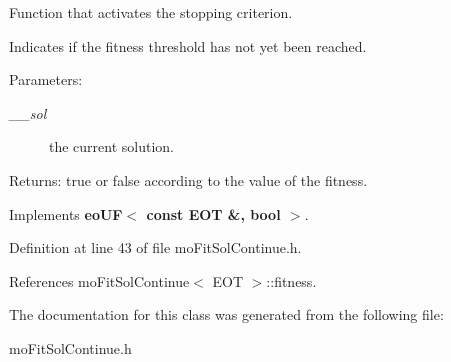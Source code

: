 Function that activates the stopping criterion. 

Indicates if the fitness threshold has not yet been reached.

\begin{Desc}
\item[Parameters:]
\begin{description}
\item[{\em \_\-\_\-sol}]the current solution. \end{description}
\end{Desc}
\begin{Desc}
\item[Returns:]true or false according to the value of the fitness. \end{Desc}


Implements {\bf eoUF$<$ const EOT \&, bool $>$}.

Definition at line 43 of file moFitSolContinue.h.

References moFitSolContinue$<$ EOT $>$::fitness.

The documentation for this class was generated from the following file:\begin{CompactItemize}
\item 
moFitSolContinue.h\end{CompactItemize}
